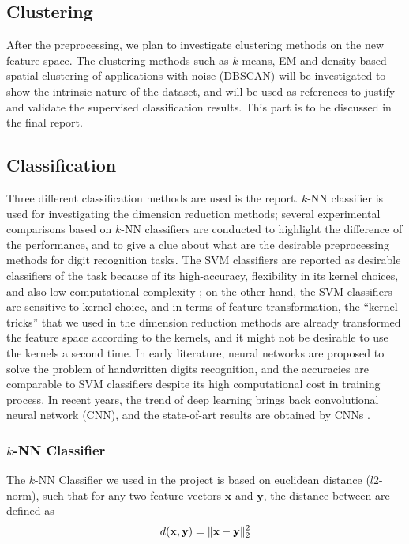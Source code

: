 \documentclass[12pt]{article}
\begin{document}
 
\subsection{Clustering}
After the preprocessing, we plan to investigate clustering methods on the new feature space. The clustering methods such as $k$-means, EM and density-based spatial clustering of applications with noise (DBSCAN) will be investigated to show the intrinsic nature of the dataset, and will be used as references to justify and validate the supervised classification results. This part is to be discussed in the final report.

\subsection{Classification}
Three different classification methods are used is the report. $k$-NN classifier is used for investigating the dimension reduction methods; several experimental comparisons based on $k$-NN classifiers are conducted to highlight the difference of the performance, and to give a clue about what are the desirable preprocessing methods for digit recognition tasks. The SVM classifiers are reported as desirable classifiers of the task because of its high-accuracy, flexibility in its kernel choices, and also low-computational complexity \cite{soltanzadeh2004recognition, bottou1994comparison, liu2003handwritten}; on the other hand, the SVM classifiers are sensitive to kernel choice, and in terms of feature transformation, the ``kernel tricks'' that we used in the dimension reduction methods are already transformed the feature space according to the kernels, and it might not be desirable to use the kernels a second time. In early literature, neural networks are proposed to solve the problem of handwritten digits recognition, and the accuracies are comparable to SVM classifiers \cite{le1990handwritten, lecun1995comparison} despite its high computational cost in training process. In recent years, the trend of deep learning brings back convolutional neural network (CNN), and the state-of-art results are obtained by CNNs \cite{cirecsan2011convolutional, ciresan2012multi}.

\subsubsection{$k$-NN Classifier}

The $k$-NN Classifier we used in the project is based on euclidean distance ($l2$-norm), such that for any two feature vectors $\mathbf{x}$ and $\mathbf{y}$, the distance between are defined as
\begin{equation}
	d({\bf x}, {\bf y}) = \|{\bf x} - {\bf y}\|_2^2
\end{equation}
\end{document}

